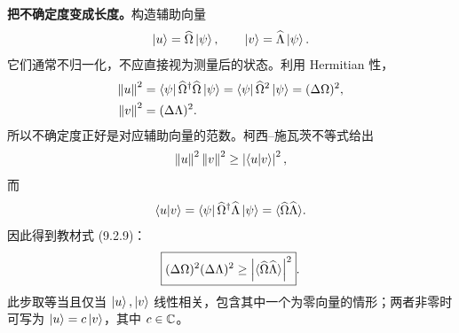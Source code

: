 \textbf{把不确定度变成长度。}构造辅助向量
\begin{equation}
  \left|u\right\rangle=\widehat\Omega\left|\psi\right\rangle,\qquad
  \left|v\right\rangle=\widehat\Lambda\left|\psi\right\rangle.
\end{equation}
它们通常不归一化，不应直接视为测量后的状态。利用 Hermitian 性，
\begin{align}
  \left\lVert u \right\rVert^2
  &=\left\langle \psi\right|\widehat\Omega^\dagger\widehat\Omega\left|\psi\right\rangle
   =\left\langle \psi\right|\widehat\Omega^2\left|\psi\right\rangle
   =(\Delta\Omega)^2,\notag\\
  \left\lVert v \right\rVert^2&=(\Delta\Lambda)^2.
\end{align}
所以不确定度正好是对应辅助向量的范数。柯西--施瓦茨不等式给出
\begin{equation}
  \left\lVert u \right\rVert^2\left\lVert v \right\rVert^2\ge\left|\left\langle u \middle| v \right\rangle\right|^2,
\end{equation}
而
\begin{equation}
  \left\langle u \middle| v \right\rangle
  =\left\langle \psi\right|\widehat\Omega^\dagger\widehat\Lambda\left|\psi\right\rangle
  =\langle\widehat\Omega\widehat\Lambda\rangle.
\end{equation}
因此得到教材式 (9.2.9)：
\begin{equation}
  \boxed{(\Delta\Omega)^2(\Delta\Lambda)^2
    \ge\left|\langle\widehat\Omega\widehat\Lambda\rangle\right|^2}.
  \label{eq:QM-C09-S02-cauchy-schwarz}
\end{equation}
此步取等当且仅当 $\left|u\right\rangle,\left|v\right\rangle$ 线性相关，包含其中一个为零向量的情形；两者非零时可写为 $\left|u\right\rangle=c\left|v\right\rangle$，其中 $c\in\mathbb{C}$。

